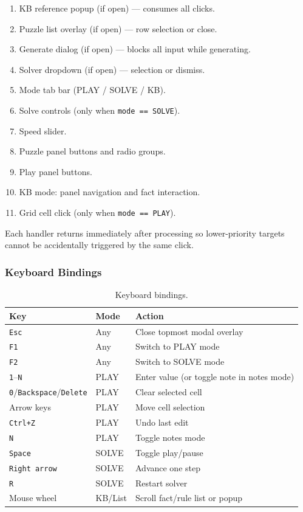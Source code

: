 \begin{enumerate}
  \item KB reference popup (if open) — consumes all clicks.
  \item Puzzle list overlay (if open) — row selection or close.
  \item Generate dialog (if open) — blocks all input while generating.
  \item Solver dropdown (if open) — selection or dismiss.
  \item Mode tab bar (PLAY / SOLVE / KB).
  \item Solve controls (only when \texttt{mode == SOLVE}).
  \item Speed slider.
  \item Puzzle panel buttons and radio groups.
  \item Play panel buttons.
  \item KB mode: panel navigation and fact interaction.
  \item Grid cell click (only when \texttt{mode == PLAY}).
\end{enumerate}

Each handler returns immediately after processing so lower-priority targets
cannot be accidentally triggered by the same click.

\subsubsection{Keyboard Bindings}

\begin{table}[h]
  \centering
  \caption{Keyboard bindings.}
  \label{tab:keybindings}
  \begin{tabular}{lll}
    \toprule
    Key & Mode & Action \\
    \midrule
    \texttt{Esc}          & Any     & Close topmost modal overlay \\
    \texttt{F1}           & Any     & Switch to PLAY mode \\
    \texttt{F2}           & Any     & Switch to SOLVE mode \\
    \texttt{1}–\texttt{N} & PLAY    & Enter value (or toggle note in notes mode) \\
    \texttt{0}/\texttt{Backspace}/\texttt{Delete} & PLAY & Clear selected cell \\
    Arrow keys            & PLAY    & Move cell selection \\
    \texttt{Ctrl+Z}       & PLAY    & Undo last edit \\
    \texttt{N}            & PLAY    & Toggle notes mode \\
    \texttt{Space}        & SOLVE   & Toggle play/pause \\
    \texttt{Right arrow}  & SOLVE   & Advance one step \\
    \texttt{R}            & SOLVE   & Restart solver \\
    Mouse wheel           & KB/List & Scroll fact/rule list or popup \\
    \bottomrule
  \end{tabular}
\end{table}

